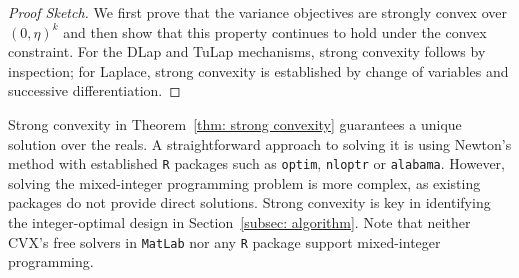 \documentclass{article}
\theoremstyle{definition}
\newtheorem{example}{Example}
\begin{document}
\begin{proof}[Proof Sketch]
    We first prove that the variance objectives are strongly convex over $(0,\eta)^k$ and then show that this property continues to hold under the convex constraint. 
    For the DLap and TuLap mechanisms, strong convexity follows by inspection; for Laplace, strong convexity is established by change of variables and successive differentiation.    
\end{proof}

Strong convexity in Theorem~\ref{thm: strong convexity} guarantees a unique solution over the reals. A straightforward approach to solving it is using Newton's method with established \texttt{R} packages such as \texttt{optim}, \texttt{nloptr} or \texttt{alabama}. However, solving the mixed-integer programming problem is more complex, as existing packages do not provide direct solutions. Strong convexity is key in identifying the integer-optimal design in Section~\ref{subsec: algorithm}. Note that neither CVX’s free solvers in \texttt{MatLab} nor any \texttt{R} package support mixed-integer programming. %




    
\end{document}

